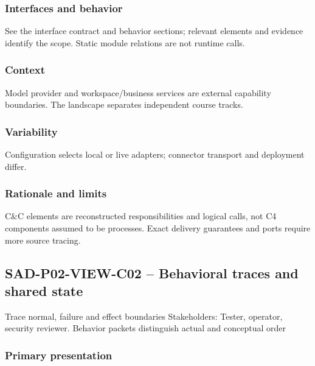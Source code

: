 \documentclass[10pt,letterpaper]{article}
\begin{document}
\subsubsection{Interfaces and behavior}
See the interface contract and behavior sections; relevant elements and evidence identify the scope. Static module relations are not runtime calls.
\subsubsection{Context}
Model provider and workspace/business services are external capability boundaries. The landscape separates independent course tracks.
\subsubsection{Variability}
Configuration selects local or live adapters; connector transport and deployment differ.
\subsubsection{Rationale and limits}
C\&C elements are reconstructed responsibilities and logical calls, not C4 components assumed to be processes. Exact delivery guarantees and ports require more source tracing.
\subsection{SAD-P02-VIEW-C02 -- Behavioral traces and shared state}
Trace normal, failure and effect boundaries Stakeholders: Tester, operator, security reviewer. Behavior packets distinguish actual and conceptual order
\subsubsection{Primary presentation}
\end{document}
